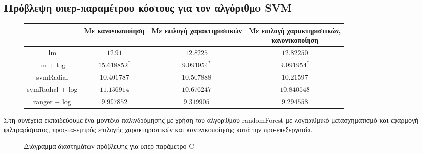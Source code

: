 \subsection{Πρόβλεψη υπερ-παραμέτρου κόστους για τον αλγόριθμo \gls{SVM} }
\begin{figure}[!htb]
	\footnotesize
	\begin{center}
		\begin{tabular}{ |c|c|c|c| } 
			\hline
			& Με κανονικοποίηση & Με επιλογή χαρακτηριστικών & \pbox{20cm}{Με επιλογή χαρακτηριστικών,\\κανονικοποίηση} \\
			\hline
			lm & $12.91$  & $12.8225$ & $12.82250$  \\
			\hline
			lm + log & $15.618852^*$ & $9.991954 ^{*}$& $9.991954^*$ \\
			\hline
			svmRadial & $10.401787$ &$10.507888$& $10.21597$\\
			\hline
			svmRadial + log& $11.136914$ & $10.676247$& $10.840548$\\
			\hline
			ranger + log  & $9.997852$ & $9.319905$ & $\bm{9.294558}$\\
			\hline
		\end{tabular}   
	\end{center}
\end{figure}

Στη συνέχεια εκπαιδεύουμε ένα μοντέλο παλινδρόμησης με χρήση του αλγορίθμου randomForest με λογαριθμικό μετασχηματισμό και εφαρμογή φιλτραρίσματος, προς-τα-εμπρός επιλογής χαρακτηριστικών και κανονικοποίησης κατά την προ-επεξεργασία.

\begin{figure} [!htb]
	\scalebox{0.85}{
}
\caption[Διάγραμμα διαστημάτων πρόβλεψης για υπερ-παράμετρο C]{Διάγραμμα διαστημάτων πρόβλεψης για υπερ-παράμετρο C}
\end{figure}
\FloatBarrier
